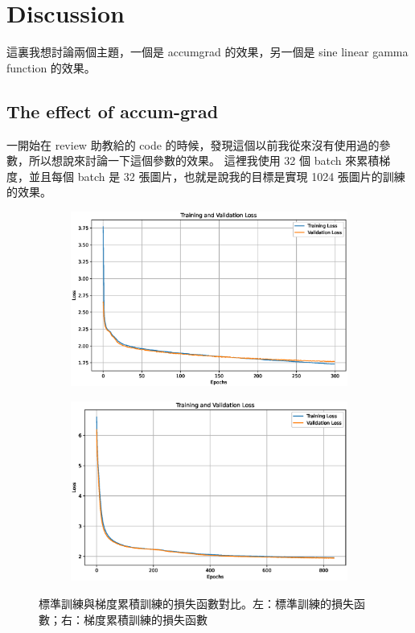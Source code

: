 \clearpage
\section{Discussion}

這裏我想討論兩個主題，一個是 accum\-grad 的效果，另一個是 sine linear gamma function 的效果。


\subsection{The effect of accum-grad}

一開始在 review 助教給的 code 的時候，發現這個以前我從來沒有使用過的參數，所以想說來討論一下這個參數的效果。 這裡我使用 32 個 batch 來累積梯度，並且每個 batch 是 32 張圖片，也就是說我的目標是實現 1024 張圖片的訓練的效果。
\begin{figure}[h]
    \centering
    \begin{subfigure}{0.48\textwidth}
        \centering
        \includegraphics[width=\textwidth]{figures/loss_plot.eps}
        \label{fig:normal_loss_plot}
    \end{subfigure}
    \hfill
    \begin{subfigure}{0.48\textwidth}
        \centering
        \includegraphics[width=\textwidth]{figures/accum-grad_loss_plot.eps}
        \label{fig:accum-grad_loss_plot}
    \end{subfigure}
    \caption{標準訓練與梯度累積訓練的損失函數對比。左：標準訓練的損失函數；右：梯度累積訓練的損失函數}
    \label{fig:loss_comparison}
\end{figure}

